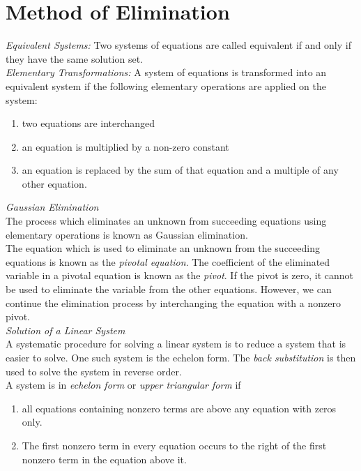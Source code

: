 \documentclass[12pt,class=book,crop=false]{standalone}
\begin{document}
\section{Method of Elimination}
\emph{Equivalent Systems:} Two systems of equations are called equivalent if and only if they have the same solution set.\\

\emph{Elementary Transformations:} A system of equations is transformed into an equivalent system if the following elementary operations are applied on the system:
\begin{enumerate}
    \item two equations are interchanged
    \item an equation is multiplied by a non-zero constant
    \item an equation is replaced by the sum of that equation and a multiple of any other equation.
\end{enumerate}
\emph{Gaussian Elimination}\\


The process which eliminates an unknown from succeeding equations using elementary operations is known as Gaussian elimination.\\
The equation which is used to eliminate an unknown from the succeeding equations is known as the \emph{pivotal equation}. The coefficient of the eliminated variable in a pivotal equation is known as the \emph{pivot}. If the pivot is zero, it cannot be used to eliminate the variable from the other equations. However, we can continue the elimination process by interchanging the equation with a nonzero pivot.\\

\emph{Solution of a Linear System}\\


A systematic procedure for solving a linear system is to reduce a system that is easier to solve. One such system is the echelon form. The \emph{back substitution} is then used to solve the system in reverse order.\\

A system is in \emph{echelon form} or \emph{upper triangular form} if
\begin{enumerate}[label={(\roman*)}]
    \item all equations containing nonzero terms are above any equation with zeros only.
    \item The first nonzero term in every equation occurs to the right of the first nonzero term in the equation above it.
\end{enumerate}
\end{document}
